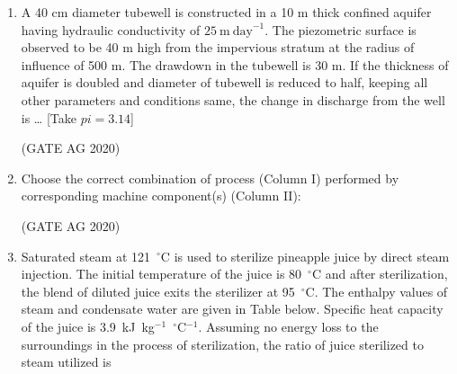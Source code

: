 \documentclass[journal]{IEEEtran}
\begin{document}
\begin{enumerate}
\item
A 40 cm diameter tubewell is constructed in a 10 m thick confined aquifer having hydraulic conductivity of \(25~\mathrm{m~day}^{-1}\). The piezometric surface is observed to be 40 m high from the impervious stratum at the radius of influence of 500 m. 
The drawdown in the tubewell is 30 m. If the thickness of aquifer is doubled and diameter of tubewell is reduced to half, keeping all other parameters and conditions same, the change in discharge from the well is \dots
\textnormal{[Take $pi = 3.14$]}

\begin{enumerate}
\end{enumerate}
\hfill(GATE AG 2020)\\

\medskip

\item
Choose the correct combination of process (Column I) performed by corresponding machine component(s) (Column II):



\begin{enumerate}
\end{enumerate}
\hfill(GATE AG 2020)\\

\medskip

\item
Saturated steam at 121~$^\circ$C is used to sterilize pineapple juice by direct steam injection. The initial temperature of the juice is 80~$^\circ$C and after sterilization, the blend of diluted juice exits the sterilizer at 95~$^\circ$C. The enthalpy values of steam and condensate water are given in Table below. Specific heat capacity of the juice is 3.9~kJ~kg$^{-1}$~$^\circ$C$^{-1}$. Assuming no energy loss to the surroundings in the process of sterilization, the ratio of juice sterilized to steam utilized is


\end{enumerate}
\end{document}
